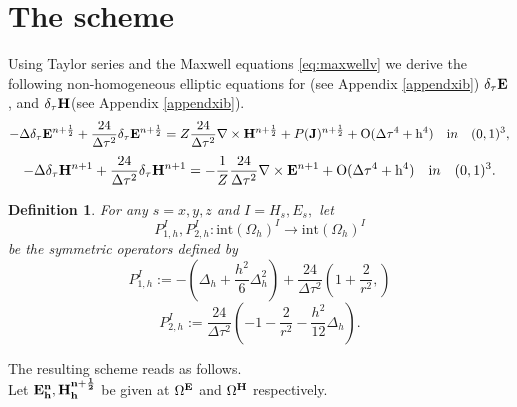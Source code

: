 \documentclass[12pt,reqno]{amsart}
\newcommand{\e}{{\bf E}}
\newcommand{\h}{{\bf H}}
\newcommand{\J}{{\bf J}}
\newtheorem{defi}[theorem]{Definition}
\newtheorem{rem}[theorem]{Remark}
\theoremstyle{definition}
\numberwithin{equation}{section}
\newcommand{\intr}[1]{\mathrm{int}(#1)}
\def\Gw{\Omega}     \def\Gx{\Xi}         \def\Gy{\Psi}
\def\Gwh{\Omega_h}
\begin{document}
	\section{The scheme}
	Using  Taylor series and the Maxwell equations \eqref{eq:maxwellv} we derive the following non-homogeneous elliptic equations for (see Appendix \ref{appendxib})
$	\delta_{\tau} \bf{E}$, and $\delta_{\tau} \bf{H}$(see Appendix \ref{appendxib}).
	$$
	-\Delta\delta_{\tau} \e^{n+\frac{1}{2}}+\frac{24}{\Delta \tau^2}\delta_{\tau}\e^{n+\frac{1}{2}}=
	Z\frac{24}{\Delta \tau^2}\nabla\times \h^{n+\frac{1}{2}}+P(\J)^{n+\frac{1}{2}}+
	\mathrm{O(\Delta \tau^4+h^4)} \quad {\mathrm in} \quad (0,1)^3,
	$$
		$$
	-\Delta \delta_{\tau}\h^{n+1}+\frac{24}{\Delta \tau^2}\delta_{\tau}\h^{n+1}=
	-\frac{1}{Z}\frac{24}{\Delta \tau^2}\nabla\times \e^{n+1}+
	\mathrm{O(\Delta \tau^4+h^4)} \quad {\mathrm in} \quad (0,1)^3.
	$$
	\begin{defi}
		For any $s=x,y,z$ and $I= H_s, E_s,$
		let $$P_{1,h}^{I}, P_{2,h}^{I}:\intr\Gwh^{I}\to \intr\Gwh^{I}$$ be the symmetric operators defined by
		$$
		P_{1,h}^{I}:=-\left (\Delta_h+\frac{h^2}{6}\Delta_h^2\right)+\frac{24}{\Delta \tau^2}\left (
		 1+\frac{2}{r^2},
		\right)
		$$
		$$
			P_{2,h}^{I}:=\frac{24}{\Delta \tau^2}\left (
		-1-\frac{2}{r^2}-\frac{h^2}{12}\Delta_h
		\right).
		$$	
		
		
	\end{defi}
	The resulting scheme reads as follows.\\[1mm]
	Let $\bf{E}^n_h, \bf{H}^{n+\frac{1}{2}}_h$  be given at $\Gw^{\e}$ and $\Gw^{\h}$ respectively. \\[2mm]
\end{document}
